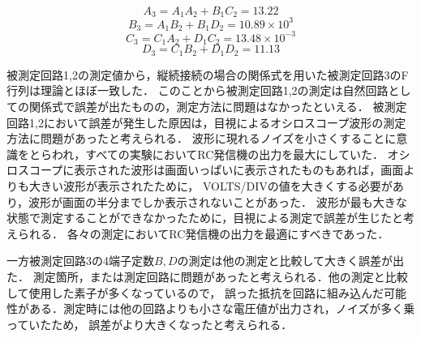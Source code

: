 $$
A_3=A_1A_2+B_1C_2=13.22
$$
$$
B_3=A_1B_2+B_1D_2=10.89\times10^3
$$
$$
C_3=C_1A_2+D_1C_2=13.48\times10^{-3}
$$
$$
D_3=C_1B_2+D_1D_2=11.13
$$


被測定回路1,2の測定値から，縦続接続の場合の関係式を用いた被測定回路3のF行列は理論とほぼ一致した．
このことから被測定回路1,2の測定は自然回路としての関係式で誤差が出たものの，測定方法に問題はなかったといえる．
被測定回路1,2において誤差が発生した原因は，目視によるオシロスコープ波形の測定方法に問題があったと考えられる．
波形に現れるノイズを小さくすることに意識をとらわれ，すべての実験においてRC発信機の出力を最大にしていた．
オシロスコープに表示された波形は画面いっぱいに表示されたものもあれば，画面よりも大きい波形が表示されたために，
VOLTS/DIVの値を大きくする必要があり，波形が画面の半分までしか表示されないことがあった．
波形が最も大きな状態で測定することができなかったために，目視による測定で誤差が生じたと考えられる．
各々の測定においてRC発信機の出力を最適にすべきであった．

一方被測定回路3の4端子定数$B,D$の測定は他の測定と比較して大きく誤差が出た．
測定箇所，または測定回路に問題があったと考えられる．他の測定と比較して使用した素子が多くなっているので，
誤った抵抗を回路に組み込んだ可能性がある．測定時には他の回路よりも小さな電圧値が出力され，ノイズが多く乗っていたため，
誤差がより大きくなったと考えられる．
